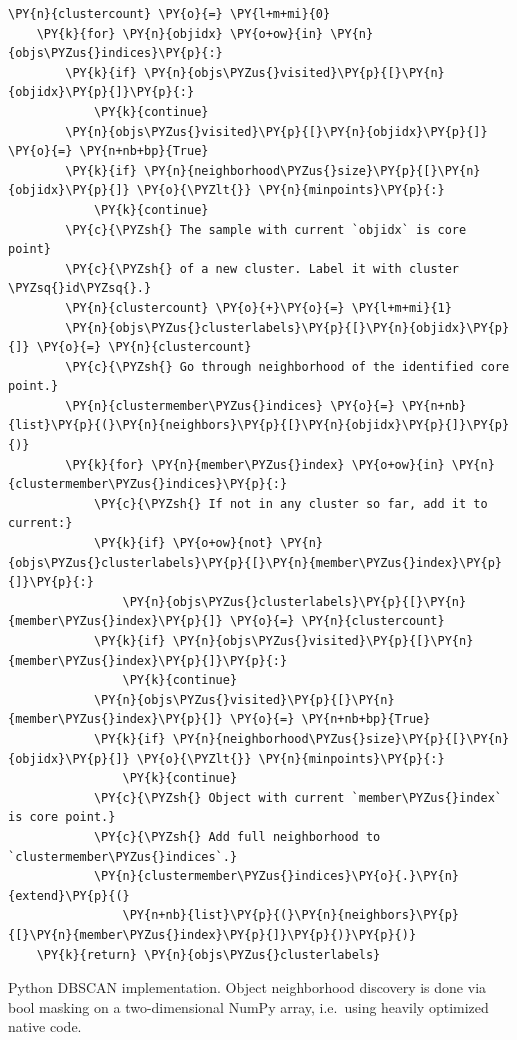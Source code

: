 \begin{listing}
\begin{Verbatim}[fontsize=\tiny,commandchars=\\\{\}]
    \PY{n}{clustercount} \PY{o}{=} \PY{l+m+mi}{0}
    \PY{k}{for} \PY{n}{objidx} \PY{o+ow}{in} \PY{n}{objs\PYZus{}indices}\PY{p}{:}
        \PY{k}{if} \PY{n}{objs\PYZus{}visited}\PY{p}{[}\PY{n}{objidx}\PY{p}{]}\PY{p}{:}
            \PY{k}{continue}
        \PY{n}{objs\PYZus{}visited}\PY{p}{[}\PY{n}{objidx}\PY{p}{]} \PY{o}{=} \PY{n+nb+bp}{True}
        \PY{k}{if} \PY{n}{neighborhood\PYZus{}size}\PY{p}{[}\PY{n}{objidx}\PY{p}{]} \PY{o}{\PYZlt{}} \PY{n}{minpoints}\PY{p}{:}
            \PY{k}{continue}
        \PY{c}{\PYZsh{} The sample with current `objidx` is core point}
        \PY{c}{\PYZsh{} of a new cluster. Label it with cluster \PYZsq{}id\PYZsq{}.}
        \PY{n}{clustercount} \PY{o}{+}\PY{o}{=} \PY{l+m+mi}{1}
        \PY{n}{objs\PYZus{}clusterlabels}\PY{p}{[}\PY{n}{objidx}\PY{p}{]} \PY{o}{=} \PY{n}{clustercount}
        \PY{c}{\PYZsh{} Go through neighborhood of the identified core point.}
        \PY{n}{clustermember\PYZus{}indices} \PY{o}{=} \PY{n+nb}{list}\PY{p}{(}\PY{n}{neighbors}\PY{p}{[}\PY{n}{objidx}\PY{p}{]}\PY{p}{)}
        \PY{k}{for} \PY{n}{member\PYZus{}index} \PY{o+ow}{in} \PY{n}{clustermember\PYZus{}indices}\PY{p}{:}
            \PY{c}{\PYZsh{} If not in any cluster so far, add it to current:}
            \PY{k}{if} \PY{o+ow}{not} \PY{n}{objs\PYZus{}clusterlabels}\PY{p}{[}\PY{n}{member\PYZus{}index}\PY{p}{]}\PY{p}{:}
                \PY{n}{objs\PYZus{}clusterlabels}\PY{p}{[}\PY{n}{member\PYZus{}index}\PY{p}{]} \PY{o}{=} \PY{n}{clustercount}
            \PY{k}{if} \PY{n}{objs\PYZus{}visited}\PY{p}{[}\PY{n}{member\PYZus{}index}\PY{p}{]}\PY{p}{:}
                \PY{k}{continue}
            \PY{n}{objs\PYZus{}visited}\PY{p}{[}\PY{n}{member\PYZus{}index}\PY{p}{]} \PY{o}{=} \PY{n+nb+bp}{True}
            \PY{k}{if} \PY{n}{neighborhood\PYZus{}size}\PY{p}{[}\PY{n}{objidx}\PY{p}{]} \PY{o}{\PYZlt{}} \PY{n}{minpoints}\PY{p}{:}
                \PY{k}{continue}
            \PY{c}{\PYZsh{} Object with current `member\PYZus{}index` is core point.}
            \PY{c}{\PYZsh{} Add full neighborhood to `clustermember\PYZus{}indices`.}
            \PY{n}{clustermember\PYZus{}indices}\PY{o}{.}\PY{n}{extend}\PY{p}{(}
                \PY{n+nb}{list}\PY{p}{(}\PY{n}{neighbors}\PY{p}{[}\PY{n}{member\PYZus{}index}\PY{p}{]}\PY{p}{)}\PY{p}{)}
    \PY{k}{return} \PY{n}{objs\PYZus{}clusterlabels}
\end{Verbatim}
\caption{
Python DBSCAN implementation. Object neighborhood discovery is done via bool
masking on a two-dimensional NumPy array, i.e.\ using heavily optimized native
code.
}
\label{listing:dbscan}
\end{listing}



